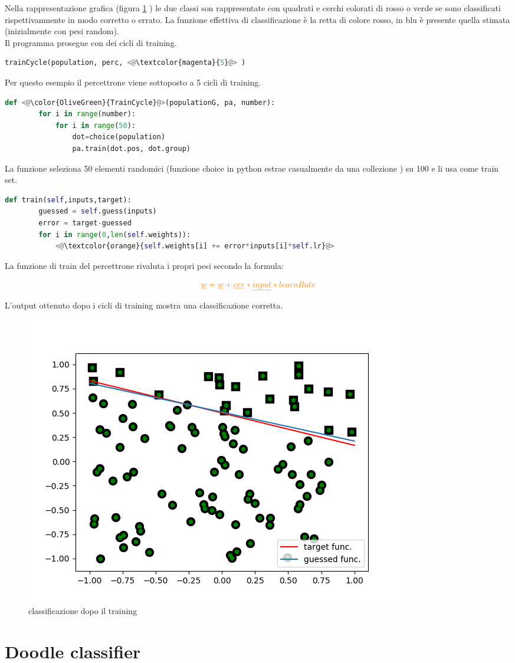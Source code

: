 \documentclass[12pt]{article}
\begin{document}
Nella rappresentazione grafica (figura \ref{fig:percBefore} ) le due classi son rappresentate con quadrati e cerchi colorati di rosso o verde se sono classificati rispettivamnente in modo corretto o errato.
La funzione effettiva di classificazione è la retta di colore rosso, in blu è presente quella stimata (inizialmente con pesi random).\\
Il programma prosegue con dei cicli di training.
\begin{lstlisting}[language=Python]
	trainCycle(population, perc, <@\textcolor{magenta}{5}@> )
\end{lstlisting}
Per questo esempio il percettrone viene sottoposto a {\color{magenta}5} cicli di training.
\begin{lstlisting}[language=Python]
	def <@\color{OliveGreen}{TrainCycle}@>(populationG, pa, number):
		for i in range(number):
			for i in range(50):
				dot=choice(population)
				pa.train(dot.pos, dot.group)
\end{lstlisting}
La funzione {\color{OliveGreen}{TrainCycle}} seleziona 50 elementi randomici (funzione choice in python estrae casualmente da una collezione ) su 100 e li usa come train set.
\newpage
\begin{lstlisting}[language=Python]
    def train(self,inputs,target):
        guessed = self.guess(inputs)
        error = target-guessed
        for i in range(0,len(self.weights)):
			<@\textcolor{orange}{self.weights[i] += error*inputs[i]*self.lr}@>
\end{lstlisting}
La funzione di train del percettrone rivaluta i propri pesi secondo la formula:

$$\color{orange}\underline{w}=\underline{w}+\underline{err}*\underline{input}*learnRate$$

L'output ottenuto dopo i cicli di training mostra una classificazione corretta.
\begin{figure}[h!]
	\centering
	\includegraphics[width=10 cm]{Perc_after.png}
	\caption{classificazione dopo il training}
	\label{fig:percBefore}
\end{figure}
\newpage
\section{Doodle classifier}
\end{document}
